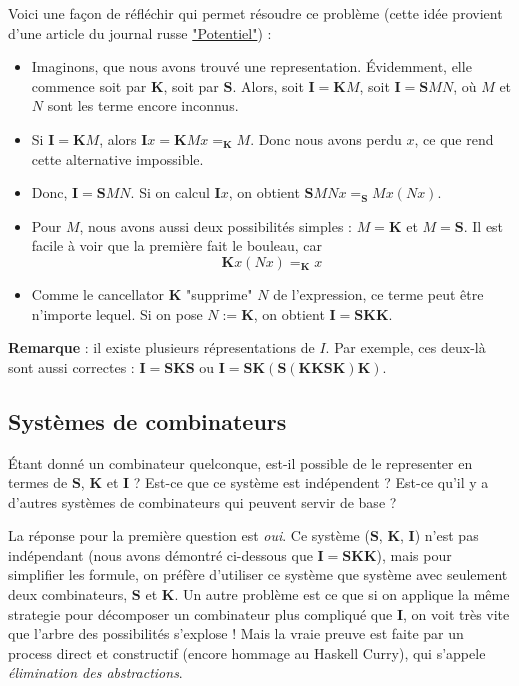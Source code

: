 Voici une façon de réfléchir qui permet résoudre ce problème (cette idée provient d'une article du journal russe \href{https://ru.wikibooks.org/wiki/\%D0\%9A\%D0\%BE\%D0\%BC\%D0\%B1\%D0\%B8\%D0\%BD\%D0\%B0\%D1\%82\%D0\%BE\%D1\%80\%D1\%8B_\%E2\%80\%94_\%D1\%8D\%D1\%82\%D0\%BE_\%D0\%BF\%D1\%80\%D0\%BE\%D1\%81\%D1\%82\%D0\%BE!}{"Potentiel"}) :
\begin{itemize}
	\item Imaginons, que nous avons trouvé une representation. Évidemment, elle commence soit par $\mathbf{K}$, soit par $\mathbf{S}$. Alors, soit $\mathbf{I} = \mathbf{K} M$, soit $\mathbf{I} = \mathbf{S} M N$, où $M$ et $N$ sont les terme encore inconnus.
	\item Si $\mathbf{I} = \mathbf{K} M$, alors $\mathbf{I} x = \mathbf{K} M x =_\mathbf{K} M$. Donc nous avons perdu $x$, ce que rend cette alternative impossible.
	\item Donc, $\mathbf{I} = \mathbf{S} M N$. Si on calcul $\mathbf{I} x$, on obtient $\mathbf{S} M N x =_\mathbf{S} M x (N x)$.
	\item Pour $M$, nous avons aussi deux possibilités simples : $M = \mathbf{K}$ et $M = \mathbf{S}$. Il est facile à voir que la première fait le bouleau, car
	\[\mathbf{K} x (N x) =_\mathbf{K} x\]
	\item Comme le cancellator $\mathbf{K}$ "supprime" $N$ de l'expression, ce terme peut être n'importe lequel. Si on pose $N := \mathbf{K}$, on obtient $\mathbf{I = SKK}$.
\end{itemize}

\textbf{Remarque} : il existe plusieurs répresentations de $I$. Par exemple, ces deux-là sont aussi correctes : $\mathbf{I = SKS}$ ou $\mathbf{I = SK(S(KKSK)K)}$.

\subsection*{Systèmes de combinateurs}

Étant donné un combinateur quelconque, est-il possible de le representer en termes de $\mathbf{S}$, $\mathbf{K}$ et $\mathbf{I}$ ? Est-ce que ce système est indépendent ? Est-ce qu'il y a d'autres systèmes de combinateurs qui peuvent servir de base ?

La réponse pour la première question est \emph{oui}. Ce système ($\mathbf{S}$, $\mathbf{K}$, $\mathbf{I}$) n'est pas indépendant (nous avons démontré ci-dessous que $\mathbf{I = SKK}$), mais pour simplifier les formule, on préfère d'utiliser ce système que système avec seulement deux combinateurs, $\mathbf{S}$ et $\mathbf{K}$. Un autre problème est ce que si on applique la même strategie pour décomposer un combinateur plus compliqué que $\mathbf{I}$, on voit très vite que l'arbre des possibilités s'explose ! Mais la vraie preuve est faite par un process direct et constructif (encore hommage au Haskell Curry), qui s'appele \emph{élimination des abstractions}.

